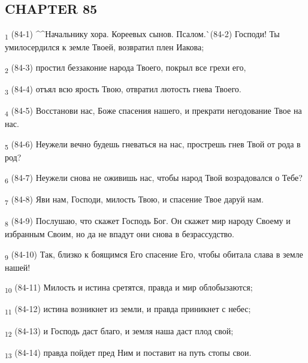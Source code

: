 \subsection{CHAPTER 85}
\begin{tcolorbox}
\textsubscript{1} (84-1) ^^Начальнику хора. Кореевых сынов. Псалом.^^ (84-2) Господи! Ты умилосердился к земле Твоей, возвратил плен Иакова;
\end{tcolorbox}
\begin{tcolorbox}
\textsubscript{2} (84-3) простил беззаконие народа Твоего, покрыл все грехи его,
\end{tcolorbox}
\begin{tcolorbox}
\textsubscript{3} (84-4) отъял всю ярость Твою, отвратил лютость гнева Твоего.
\end{tcolorbox}
\begin{tcolorbox}
\textsubscript{4} (84-5) Восстанови нас, Боже спасения нашего, и прекрати негодование Твое на нас.
\end{tcolorbox}
\begin{tcolorbox}
\textsubscript{5} (84-6) Неужели вечно будешь гневаться на нас, прострешь гнев Твой от рода в род?
\end{tcolorbox}
\begin{tcolorbox}
\textsubscript{6} (84-7) Неужели снова не оживишь нас, чтобы народ Твой возрадовался о Тебе?
\end{tcolorbox}
\begin{tcolorbox}
\textsubscript{7} (84-8) Яви нам, Господи, милость Твою, и спасение Твое даруй нам.
\end{tcolorbox}
\begin{tcolorbox}
\textsubscript{8} (84-9) Послушаю, что скажет Господь Бог. Он скажет мир народу Своему и избранным Своим, но да не впадут они снова в безрассудство.
\end{tcolorbox}
\begin{tcolorbox}
\textsubscript{9} (84-10) Так, близко к боящимся Его спасение Его, чтобы обитала слава в земле нашей!
\end{tcolorbox}
\begin{tcolorbox}
\textsubscript{10} (84-11) Милость и истина сретятся, правда и мир облобызаются;
\end{tcolorbox}
\begin{tcolorbox}
\textsubscript{11} (84-12) истина возникнет из земли, и правда приникнет с небес;
\end{tcolorbox}
\begin{tcolorbox}
\textsubscript{12} (84-13) и Господь даст благо, и земля наша даст плод свой;
\end{tcolorbox}
\begin{tcolorbox}
\textsubscript{13} (84-14) правда пойдет пред Ним и поставит на путь стопы свои.
\end{tcolorbox}
